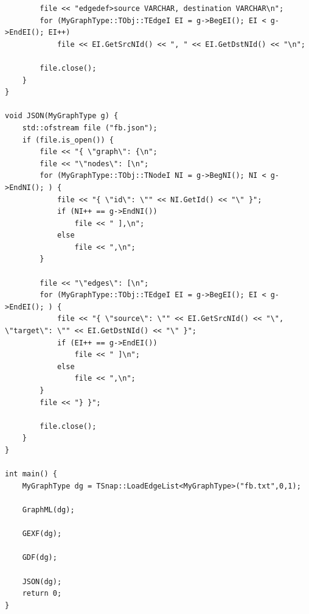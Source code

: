 \documentclass{article}
\begin{document}
\begin{lstlisting}
		file << "edgedef>source VARCHAR, destination VARCHAR\n"; 
		for (MyGraphType::TObj::TEdgeI EI = g->BegEI(); EI < g->EndEI(); EI++)
			file << EI.GetSrcNId() << ", " << EI.GetDstNId() << "\n";

		file.close();
	}
}

void JSON(MyGraphType g) {
	std::ofstream file ("fb.json");
	if (file.is_open()) {
		file << "{ \"graph\": {\n";
		file << "\"nodes\": [\n";
		for (MyGraphType::TObj::TNodeI NI = g->BegNI(); NI < g->EndNI(); ) {
			file << "{ \"id\": \"" << NI.GetId() << "\" }";
			if (NI++ == g->EndNI())
				file << " ],\n";
			else
				file << ",\n";
		}

		file << "\"edges\": [\n";
		for (MyGraphType::TObj::TEdgeI EI = g->BegEI(); EI < g->EndEI(); ) {
			file << "{ \"source\": \"" << EI.GetSrcNId() << "\", \"target\": \"" << EI.GetDstNId() << "\" }";
			if (EI++ == g->EndEI())
				file << " ]\n";
			else
				file << ",\n";
		}
		file << "} }";

		file.close();
	}
}

int main() {
	MyGraphType dg = TSnap::LoadEdgeList<MyGraphType>("fb.txt",0,1);
	
	GraphML(dg);

	GEXF(dg);

	GDF(dg);

	JSON(dg);
	return 0;
}
\end{lstlisting}
\end{document}
